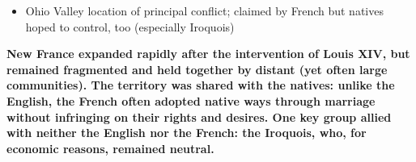 \documentclass[a4paper]{article}
\begin{document}
{\begin{itemize}
\begin{itemize}
\begin{itemize}
\begin{itemize}
                \end{itemize}
                \item Ohio Valley location of principal conflict; claimed by French but natives hoped to control, too (especially Iroquois)
            \end{itemize}
        \end{itemize}
    \end{itemize}
    \textbf{New France expanded rapidly after the intervention of Louis XIV, but remained fragmented and held together by distant (yet often large communities). The territory was shared with the natives: unlike the English, the French often adopted native ways through marriage without infringing on their rights and desires. One key group allied with neither the English nor the French: the Iroquois, who, for economic reasons, remained neutral.}}
\end{document}
